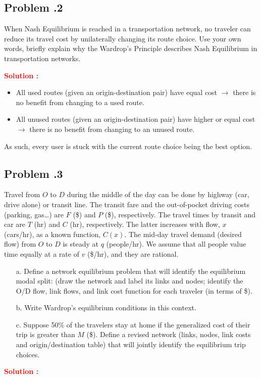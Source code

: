 \documentclass[12pt]{article}
\newcommand{\customsubsection}[1]{
  \subsection*{Problem \thesection.#1}
}
\begin{document}
\customsubsection{2}
When Nash Equilibrium is reached in a transportation network, no traveler can reduce its travel cost by unilaterally changing its route choice.  Use your own words, briefly explain why the Wardrop’s Principle describes Nash Equilibrium in transportation networks. 


\textbf{\textcolor{red}{Solution :}} 
\begin{itemize}
    \item All used routes (given an origin-destination pair) have equal cost $\rightarrow$ there is no benefit from changing to a used route.
    \item All unused routes (given an origin-destination pair) have higher or equal cost $\rightarrow$ there is no benefit from changing to an unused route.
\end{itemize}
As such, every user is stuck with the current route choice being the best option.


\newpage



\customsubsection{3}
Travel from $O$ to $D$ during the middle of the day can be done by highway (car, drive alone) or transit line. The transit fare and the out-of-pocket driving costs (parking, gas…) are $F$ (\$) and $P$ (\$), respectively. The travel times by transit and car are $T$ (hr) and $C$ (hr), respectively. The latter increases with flow, $x$ (cars/hr), as a known function, $C(x)$. The mid-day travel demand (desired flow) from $O$ to $D$ is steady at $q$ (people/hr). We assume that all people value time equally at a rate of $v$ (\$/hr), and they are rational.
\begin{enumerate}
    \item[a.] Define a network equilibrium problem that will identify the equilibrium modal split: (draw the network and label its links and nodes; identify the O/D flow, link flows, and link cost function for each traveler (in terms of \$).
    \item[b.] Write Wardrop’s equilibrium conditions in this context.
    \item[c.] Suppose 50\% of the travelers stay at home if the generalized cost of their trip is greater than $M$ (\$). Define a revised network (links, nodes, link costs and origin/destination table) that will jointly identify the equilibrium trip choices.
\end{enumerate}
\textbf{\textcolor{red}{Solution :}} \\
\end{document}
